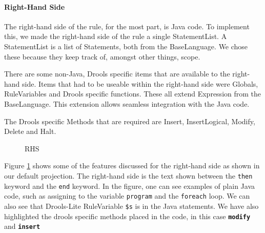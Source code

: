 \paragraph{Right-Hand Side} The right-hand side of the rule, for the most part, is Java code.
To implement this, we made the right-hand side of the rule a single StatementList.
A StatementList is a list of Statements, both from the BaseLanguage.
We chose these because they keep track of, amongst other things, scope.

There are some non-Java, Drools specific items that are available to the right-hand side.
Items that had to be useable within the right-hand side were Globals, RuleVariables and Drools specific functions.
These all extend Expression from the BaseLanguage.
This extension allows seamless integration with the Java code.

The Drools specific Methods that are required are Insert, InsertLogical, Modify, Delete and Halt.

\begin{figure}[!h]
    \centering
    \caption{RHS}
    \label{fig:RHS}
\end{figure}

Figure \ref{fig:RHS} shows some of the features discussed for the right-hand side as shown in our default projection.
The right-hand side is the text shown between the \texttt{then} keyword and the \texttt{end} keyword.
In the figure, one can see examples of plain Java code, such as assigning to the variable \texttt{program} and the \texttt{foreach} loop.
We can also see that Drools-Lite RuleVariable \texttt{\$s} is in the Java statements.
We have also highlighted the drools specific methods placed in the code, in this case \texttt{\textbf{modify}} and \texttt{\textbf{insert}}   

